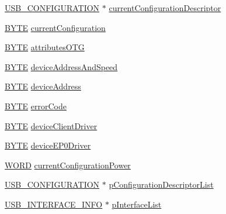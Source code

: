 \begin{DoxyCompactItemize}
\item 
\hyperlink{usb__host__local_8h_af0711275ba2462f882eefcc4e3ac562d}{U\+S\+B\+\_\+\+C\+O\+N\+F\+I\+G\+U\+R\+A\+T\+I\+O\+N} $\ast$ \hyperlink{struct___u_s_b___d_e_v_i_c_e___i_n_f_o_a6e7131dde9ec6a941e277e72dc602bf4}{current\+Configuration\+Descriptor}
\item 
\hyperlink{_generic_type_defs_8h_a4ae1dab0fb4b072a66584546209e7d58}{B\+Y\+T\+E} \hyperlink{struct___u_s_b___d_e_v_i_c_e___i_n_f_o_a1480af8b85197825908880c1b95a7bfa}{current\+Configuration}
\item 
\hyperlink{_generic_type_defs_8h_a4ae1dab0fb4b072a66584546209e7d58}{B\+Y\+T\+E} \hyperlink{struct___u_s_b___d_e_v_i_c_e___i_n_f_o_a542053df7d6ed3ea90dd473b47c89a33}{attributes\+O\+T\+G}
\item 
\hyperlink{_generic_type_defs_8h_a4ae1dab0fb4b072a66584546209e7d58}{B\+Y\+T\+E} \hyperlink{struct___u_s_b___d_e_v_i_c_e___i_n_f_o_a481c1b0003e3f825eaabb84db7d63f88}{device\+Address\+And\+Speed}
\item 
\hyperlink{_generic_type_defs_8h_a4ae1dab0fb4b072a66584546209e7d58}{B\+Y\+T\+E} \hyperlink{struct___u_s_b___d_e_v_i_c_e___i_n_f_o_aa1d659071a17ee8d0172d34d6783b517}{device\+Address}
\item 
\hyperlink{_generic_type_defs_8h_a4ae1dab0fb4b072a66584546209e7d58}{B\+Y\+T\+E} \hyperlink{struct___u_s_b___d_e_v_i_c_e___i_n_f_o_aeed843858495988cfbec7df4f05862cb}{error\+Code}
\item 
\hyperlink{_generic_type_defs_8h_a4ae1dab0fb4b072a66584546209e7d58}{B\+Y\+T\+E} \hyperlink{struct___u_s_b___d_e_v_i_c_e___i_n_f_o_a4ead2264d70f86ec792ea2c477d4b0d3}{device\+Client\+Driver}
\item 
\hyperlink{_generic_type_defs_8h_a4ae1dab0fb4b072a66584546209e7d58}{B\+Y\+T\+E} \hyperlink{struct___u_s_b___d_e_v_i_c_e___i_n_f_o_a8deaadba809721fa4d0b12ce4a21474b}{device\+E\+P0\+Driver}
\item 
\hyperlink{_generic_type_defs_8h_a2b0e863dadf920709ec53d9088ee7c91}{W\+O\+R\+D} \hyperlink{struct___u_s_b___d_e_v_i_c_e___i_n_f_o_a58b65ab35d2386c0c9658c8ca1ed53da}{current\+Configuration\+Power}
\item 
\hyperlink{usb__host__local_8h_af0711275ba2462f882eefcc4e3ac562d}{U\+S\+B\+\_\+\+C\+O\+N\+F\+I\+G\+U\+R\+A\+T\+I\+O\+N} $\ast$ \hyperlink{struct___u_s_b___d_e_v_i_c_e___i_n_f_o_a5da75aa594bc20c0b9b850550184d217}{p\+Configuration\+Descriptor\+List}
\item 
\hyperlink{usb__host__local_8h_aa47590af1f69d05e9dfaa02faefeca99}{U\+S\+B\+\_\+\+I\+N\+T\+E\+R\+F\+A\+C\+E\+\_\+\+I\+N\+F\+O} $\ast$ \hyperlink{struct___u_s_b___d_e_v_i_c_e___i_n_f_o_a3858a517074df05e06ca0e9fe78bf525}{p\+Interface\+List}

\end{DoxyCompactItemize}
